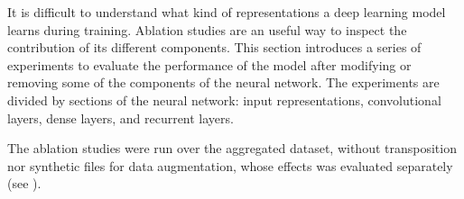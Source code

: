 
It is difficult to understand what kind of representations a
deep learning model learns during training. Ablation studies
are an useful way to inspect the contribution of its
different components. This section introduces a series of
experiments to evaluate the performance of the model after
modifying or removing some of the components of the neural
network. The experiments are divided by sections of the
neural network: input representations, convolutional layers,
dense layers, and recurrent layers.

The ablation studies were run over the aggregated dataset,
without transposition nor synthetic files for data
augmentation, whose effects was evaluated separately (see
).
